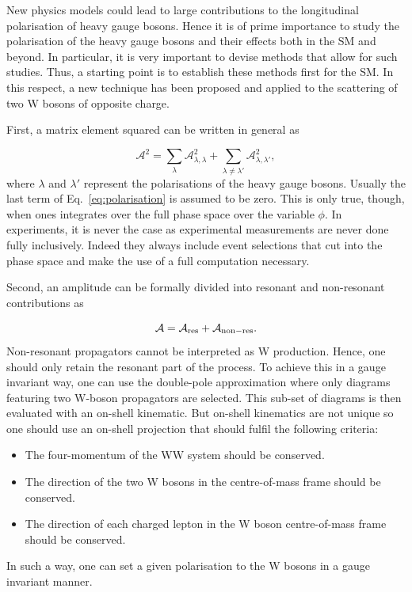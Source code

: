 New physics models could lead to large contributions to the longitudinal polarisation of heavy gauge bosons.
Hence it is of prime importance to study the polarisation of the heavy gauge bosons and their effects both in the SM and beyond.
In particular, it is very important to devise methods that allow for such studies.
Thus, a starting point is to establish these methods first for the SM.
In this respect, a new technique has been proposed and applied to the scattering of two W bosons of opposite charge.

First, a matrix element squared can be written in general as

\begin{equation}
\label{eq:polarisation}
 \mathcal{A}^2 = \sum_{\lambda} \mathcal{A}^2_{\lambda, \lambda} + \sum_{\lambda \neq \lambda'} \mathcal{A}^2_{\lambda, \lambda'}, 
\end{equation}
%
where $\lambda$ and $\lambda'$ represent the polarisations of the heavy gauge bosons.
Usually the last term of Eq.~\eqref{eq:polarisation} is assumed to be zero.
This is only true, though, when ones integrates over the full phase space over the variable $\phi$.
In experiments, it is never the case as experimental measurements are never done fully inclusively.
Indeed they always include event selections that cut into the phase space and make the use of a full computation necessary.

Second, an amplitude can be formally divided into resonant and non-resonant contributions as

\begin{equation}
\mathcal{A} = \mathcal{A}_{\rm res} + \mathcal{A}_{\rm non-res} .
\end{equation}
%
Non-resonant propagators cannot be interpreted as W production.
Hence, one should only retain the resonant part of the process.
To achieve this in a gauge invariant way, one can use the double-pole approximation where only diagrams featuring two W-boson propagators are selected.
This sub-set of diagrams is then evaluated with an on-shell kinematic.
But on-shell kinematics are not unique so one should use an on-shell projection that should fulfil the following criteria:
\begin{itemize}
 \item The four-momentum of the WW system should be conserved.
 \item The direction of the two W bosons in the centre-of-mass frame should be conserved.
 \item The direction of each charged lepton in the W boson centre-of-mass frame should be conserved.
\end{itemize}
%
In such a way, one can set a given polarisation to the W bosons in a gauge invariant manner.

